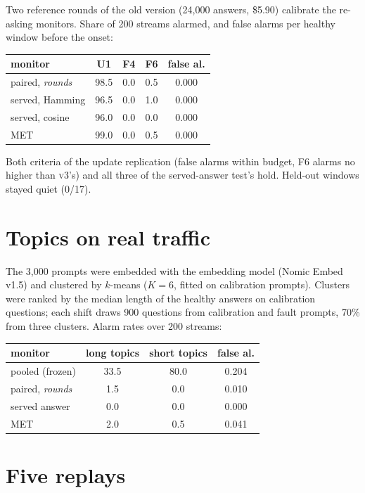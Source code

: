 \documentclass[11pt]{article}
\newcommand{\vthree}{\textsc{v3}}
\begin{document}
Two reference rounds of the old version (24{,}000 answers, \$5.90) calibrate the
re-asking monitors. Share of 200 streams alarmed, and false alarms per healthy
window before the onset:

\begin{center}\small
\begin{tabular}{lcccc}
  \toprule
  monitor & U1 & F4 & F6 & false al. \\
  \midrule
  paired, \emph{rounds} & 98.5 & 0.0 & 0.5 & 0.000 \\
  served, Hamming & 96.5 & 0.0 & 1.0 & 0.000 \\
  served, cosine & 96.0 & 0.0 & 0.0 & 0.000 \\
  MET & 99.0 & 0.0 & 0.5 & 0.000 \\
  \bottomrule
\end{tabular}
\end{center}

\noindent Both criteria of the update replication (false alarms within budget, F6
alarms no higher than \vthree{}'s) and all three of the served-answer test's hold.
Held-out windows stayed quiet (0/17).

\section{Topics on real traffic}
\label{app:topics}

The 3{,}000 prompts were embedded with the embedding model (Nomic Embed v1.5) and clustered by $k$-means
($K=6$, fitted on calibration prompts). Clusters were ranked by the median length of
the healthy answers on calibration questions; each shift draws 900 questions from
calibration and fault prompts, 70\% from three clusters. Alarm rates over 200
streams:

\begin{center}\small
\begin{tabular}{lccc}
  \toprule
  monitor & long topics & short topics & false al. \\
  \midrule
  pooled (frozen) & 33.5 & 80.0 & 0.204 \\
  paired, \emph{rounds} & 1.5 & 0.0 & 0.010 \\
  served answer & 0.0 & 0.0 & 0.000 \\
  MET & 2.0 & 0.5 & 0.041 \\
  \bottomrule
\end{tabular}
\end{center}

\section{Five replays}
\label{app:replays}
\end{document}
